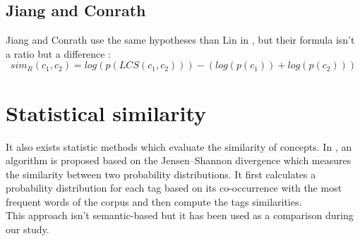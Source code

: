 
\subsection{Jiang and Conrath} %
\label{sub:jiang_and_conrath}
Jiang and Conrath use the same hypotheses than Lin in \cite{jiang1997semantic}, but their formula isn't a ratio but a difference :
\begin{equation}
\label{eq:jiangConrath}
sim_R(c_1, c_2) = log(p(LCS(c_1,c_2))) - (log(p(c_1)) + log(p(c_2)))
\end{equation}


\section{Statistical similarity} %
\label{sec:statistical_similarity}
It also exists statistic methods which evaluate the similarity of concepts. In \cite{mousselly2013tag}, an algorithm is proposed based on the Jensen–Shannon divergence which measures the similarity between two probability distributions. It first calculates a probability distribution for each tag based on its co-occurrence with the most frequent words of the corpus and then compute the tags similarities.\\
This approach isn't semantic-based but it has been used as a comparison during our study.
